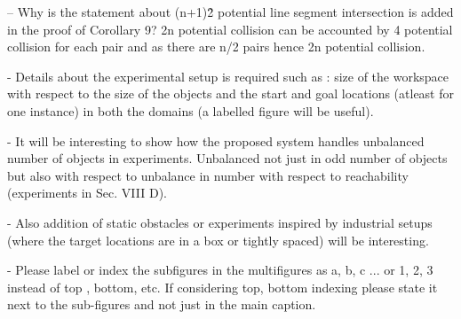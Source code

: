 \documentclass[journal]{IEEEtran}
\begin{document}
	\begin{partt}
		-- Why is the statement about (n+1)\^2 potential line segment intersection is added in the proof of Corollary 9? 2n potential collision can be accounted by 4 potential collision for each pair and as there are n/2 pairs hence 2n potential collision.
	\end{partt}
	\begin{partt}
		
		- Details about the experimental setup is required such as : size of the workspace with respect to the size of the objects and the start and goal locations (atleast for one instance) in both the domains (a labelled figure will be useful). 
	\end{partt}
	\begin{partt} 
		
		- It will be interesting to show how the proposed system handles unbalanced number of objects in experiments. Unbalanced not just in odd number of objects but also with respect to unbalance in number with respect to reachability (experiments in Sec. VIII D).
	\end{partt}
	\begin{partt}
		
		- Also addition of static obstacles or experiments inspired by industrial setups (where the target locations are in a box or tightly spaced) will be interesting.
	\end{partt}
	\begin{partt}
		
		- Please label or index the subfigures in the multifigures as a, b, c ... or 1, 2, 3 instead of top , bottom, etc. If considering top, bottom indexing please state it next to the sub-figures and not just in the main caption.
	\end{partt}
\end{document}
